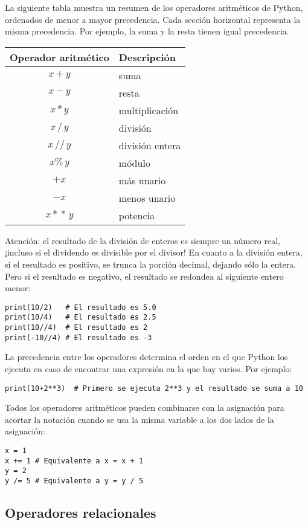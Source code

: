La siguiente tabla muestra un resumen de los operadores aritméticos de Python, ordenados de menor a mayor precedencia. Cada sección horizontal representa la misma precedencia. Por ejemplo, la suma y la resta tienen igual precedencia.

\begin{tabular}{c|l}
	Operador aritmético & Descripción\\
	\hline\hline
	$x+y$ & suma\\
	$x-y$ & resta\\
	\hline
	$x*y$ & multiplicación\\
	$x\,/\,y$ & división\\
	$x\,//\,y$ & división entera\\
	$x\%\,y$ & módulo\\
	\hline
	$+x$ & más unario\\
	$-x$ & menos unario\\
	\hline
	$x*\!*\, y$ & potencia
\end{tabular}

Atención: el resultado de la división de enteros es siempre un número real, ¡incluso si el dividendo es divisible por el divisor! En cuanto a la división entera, si el resultado es positivo, se trunca la porción decimal, dejando sólo la entera. Pero si el resultado es negativo, el resultado se redondea al siguiente entero menor:

\begin{lstlisting}
print(10/2)   # El resultado es 5.0
print(10/4)   # El resultado es 2.5
print(10//4)  # El resultado es 2
print(-10//4) # El resultado es -3
\end{lstlisting}

La precedencia entre los operadores determina el orden en el que Python los ejecuta en caso de encontrar una expresión en la que hay varios. Por ejemplo:

\begin{lstlisting}
print(10+2**3)  # Primero se ejecuta 2**3 y el resultado se suma a 10
\end{lstlisting}

Todos los operadores aritméticos pueden combinarse con la asignación para acortar la notación cuando se usa la misma variable a los dos lados de la asignación:

\begin{lstlisting}
x = 1
x += 1 # Equivalente a x = x + 1
y = 2
y /= 5 # Equivalente a y = y / 5 
\end{lstlisting}

\subsection{Operadores relacionales}\label{sec:relacionales}

